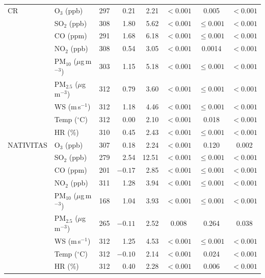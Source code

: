 \begin{longtable}{@{}llrrrccc@{}}
CR        & O$_3$ (ppb)                      & 297 & 0.21 & 2.21  & $<0.001$ & 0.005       & $<0.001$ \\
          & SO$_2$ (ppb)                     & 308 & 1.80 & 5.62  & $<0.001$ & $\leq0.001$ & $<0.001$ \\
          & CO (ppm)                         & 291 & 1.68 & 6.18  & $<0.001$ & $\leq0.001$ & $<0.001$ \\
          & NO$_2$ (ppb)                     & 308 & 0.54 & 3.05  & $<0.001$ & 0.0014      & $<0.001$ \\
          & PM$_{10}$ ($\mu$g\,m$^{-3}$)     & 303 & 1.15 & 5.18  & $<0.001$ & $\leq0.001$ & $<0.001$ \\
          & PM$_{2.5}$ ($\mu$g\,m$^{-3}$)    & 312 & 0.79 & 3.60  & $<0.001$ & $\leq0.001$ & $<0.001$ \\
          & WS (m\,s$^{-1}$)                 & 312 & 1.18 & 4.46  & $<0.001$ & $\leq0.001$ & $<0.001$ \\
          & Temp ($^{\circ}$C)               & 312 & 0.00 & 2.10  & $<0.001$ & 0.018       & $<0.001$ \\
          & HR (\%)                          & 310 & 0.45 & 2.43  & $<0.001$ & $\leq0.001$ & $<0.001$ \\
\midrule
NATIVITAS & O$_3$ (ppb)                      & 307 & 0.18 & 2.24  & $<0.001$ & 0.120       & 0.002 \\
          & SO$_2$ (ppb)                     & 279 & 2.54 & 12.51 & $<0.001$ & $\leq0.001$ & $<0.001$ \\
          & CO (ppm)                         & 201 & $-0.17$ & 2.85 & $<0.001$ & $\leq0.001$ & $<0.001$ \\
          & NO$_2$ (ppb)                     & 311 & 1.28 & 3.94  & $<0.001$ & $\leq0.001$ & $<0.001$ \\
          & PM$_{10}$ ($\mu$g\,m$^{-3}$)     & 168 & 1.04 & 3.93  & $<0.001$ & $\leq0.001$ & $<0.001$ \\
          & PM$_{2.5}$ ($\mu$g\,m$^{-3}$)    & 265 & $-0.11$ & 2.52 & 0.008   & 0.264       & 0.038 \\
          & WS (m\,s$^{-1}$)                 & 312 & 1.25 & 4.53  & $<0.001$ & $\leq0.001$ & $<0.001$ \\
          & Temp ($^{\circ}$C)               & 312 & $-0.10$ & 2.14 & $<0.001$ & 0.024      & $<0.001$ \\
          & HR (\%)                          & 312 & 0.40 & 2.28  & $<0.001$ & 0.006       & $<0.001$ \\

\end{longtable}
